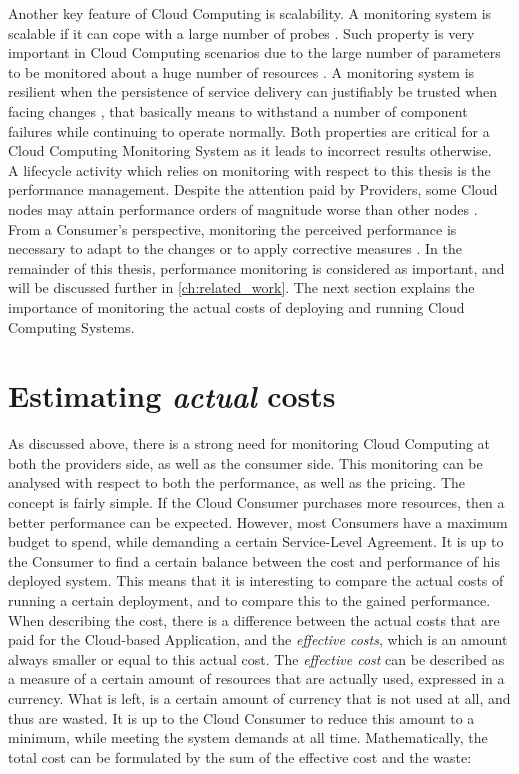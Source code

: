 \noindent
Another key feature of Cloud Computing is scalability. A monitoring system is scalable if it can cope with a large number of probes \cite{clayman2010monitoring}. Such property is very important in Cloud Computing scenarios due to the large number of parameters to be monitored about a huge number of resources \cite{aceto2013cloud}. A monitoring system is resilient when the persistence of service delivery can justifiably be trusted when facing changes \cite{laprie2008dependability}, that basically means to withstand a number of component failures while continuing to operate normally. Both properties are critical for a Cloud Computing Monitoring System as it leads to incorrect results otherwise.\\

\noindent
A lifecycle activity which relies on monitoring with respect to this thesis is the performance management. Despite the attention paid by Providers, some Cloud nodes may attain performance orders of magnitude worse than other nodes \cite{fox2009above}. From a Consumer's perspective, monitoring the perceived performance is necessary to adapt to the changes or to apply corrective measures \cite{aceto2013cloud}. In the remainder of this thesis, performance monitoring is considered as important, and will be discussed further in \autoref{ch:related_work}. The next section explains the importance of monitoring the actual costs of deploying and running Cloud Computing Systems.

\section{Estimating \textit{actual} costs} \label{sec:intro_pricing}
As discussed above, there is a strong need for monitoring Cloud Computing at both the providers side, as well as the consumer side. This monitoring can be analysed with respect to both the performance, as well as the pricing. The concept is fairly simple. If the Cloud Consumer purchases more resources, then a better performance can be expected. However, most Consumers have a maximum budget to spend, while demanding a certain Service-Level Agreement. It is up to the Consumer to find a certain balance between the cost and performance of his deployed system. This means that it is interesting to compare the actual costs of running a certain deployment, and to compare this to the gained performance. When describing the cost, there is a difference between the actual costs that are paid for the Cloud-based Application, and the \textit{effective costs}, which is an amount always smaller or equal to this actual cost. The \textit{effective cost} can be described as a measure of a certain amount of resources that are actually used, expressed in a currency. What is left, is a certain amount of currency that is not used at all, and thus are wasted. It is up to the Cloud Consumer to reduce this amount to a minimum, while meeting the system demands at all time. Mathematically, the total cost can be formulated by the sum of the effective cost and the waste:

